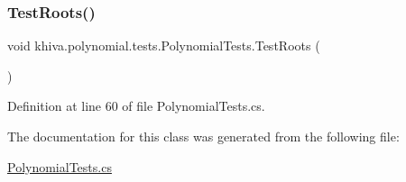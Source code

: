 \subsubsection{\texorpdfstring{Test\+Roots()}{TestRoots()}}
{\footnotesize\ttfamily void khiva.\+polynomial.\+tests.\+Polynomial\+Tests.\+Test\+Roots (\begin{DoxyParamCaption}{ }\end{DoxyParamCaption})\hspace{0.3cm}{\ttfamily [inline]}}



Definition at line 60 of file Polynomial\+Tests.\+cs.



The documentation for this class was generated from the following file\+:\begin{DoxyCompactItemize}
\item 
\mbox{\hyperlink{_polynomial_tests_8cs}{Polynomial\+Tests.\+cs}}\end{DoxyCompactItemize}
